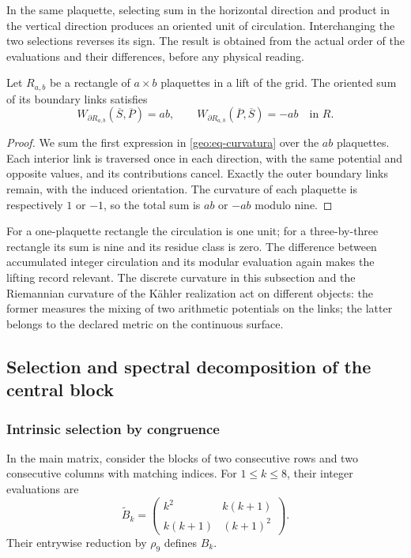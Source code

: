 In the same plaquette, selecting sum in the horizontal direction and product in the vertical direction produces an oriented unit of circulation. Interchanging the two selections reverses its sign. The result is obtained from the actual order of the evaluations and their differences, before any physical reading.

\begin{teorema}
\label{geo:thm-stokes}
Let $R_{a,b}$ be a rectangle of $a\times b$ plaquettes in a lift of the grid. The oriented sum of its boundary links satisfies
\[
 W_{\partial R_{a,b}}(\overline S,\overline P)=ab,
 \qquad
 W_{\partial R_{a,b}}(\overline P,\overline S)=-ab
 \quad\text{in }R.
\]
\end{teorema}

\begin{proof}
We sum the first expression in \eqref{geo:eq-curvatura} over the $ab$ plaquettes. Each interior link is traversed once in each direction, with the same potential and opposite values, and its contributions cancel. Exactly the outer boundary links remain, with the induced orientation. The curvature of each plaquette is respectively $1$ or $-1$, so the total sum is $ab$ or $-ab$ modulo nine.
\end{proof}

For a one-plaquette rectangle the circulation is one unit; for a three-by-three rectangle its sum is nine and its residue class is zero. The difference between accumulated integer circulation and its modular evaluation again makes the lifting record relevant. The discrete curvature in this subsection and the Riemannian curvature of the Kähler realization act on different objects: the former measures the mixing of two arithmetic potentials on the links; the latter belongs to the declared metric on the continuous surface.

\subsection{Selection and spectral decomposition of the central block}
\label{geo:bloque-central}

\subsubsection{Intrinsic selection by congruence}

In the main matrix, consider the blocks of two consecutive rows and two consecutive columns with matching indices. For $1\leq k\leq8$, their integer evaluations are
\[
 \widetilde B_k=
 \begin{pmatrix}k^2&k(k+1)\\k(k+1)&(k+1)^2\end{pmatrix}.
\]
Their entrywise reduction by $\rho_9$ defines $B_k$.

